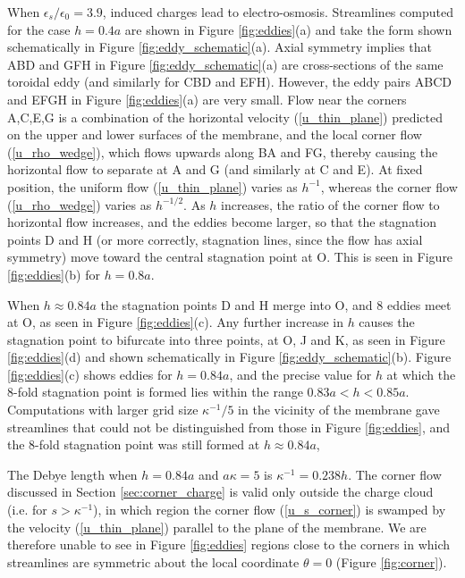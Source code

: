 When $\epsilon_s/\epsilon_0=3.9$, induced charges
lead to electro-osmosis.
Streamlines computed for the case $h=0.4a$ are shown in
Figure \ref{fig:eddies}(a) and take the form shown schematically in
Figure \ref{fig:eddy_schematic}(a).
Axial symmetry implies that ABD and GFH in Figure \ref{fig:eddy_schematic}(a)
are cross-sections of the same
toroidal eddy (and similarly for CBD and EFH).
However, the eddy pairs ABCD and EFGH in Figure \ref{fig:eddies}(a) are
very small. Flow near the corners A,C,E,G is a combination of the horizontal
velocity (\ref{u_thin_plane}) predicted on the upper and
lower surfaces of the membrane,
and the local corner flow (\ref{u_rho_wedge}), which flows upwards
along BA and FG, thereby causing the horizontal flow to separate at A and G
(and similarly at C and E).  At fixed position, the
uniform flow (\ref{u_thin_plane}) varies as $h^{-1}$, whereas the
corner flow (\ref{u_rho_wedge}) varies as 
$h^{-1/2}$. As $h$ increases, the ratio of the corner flow to horizontal flow
increases, and the eddies become larger, so that the stagnation
points D and H 
(or more correctly, stagnation lines, since the flow has axial symmetry)
move toward the central stagnation point at O.
This is seen in 
Figure \ref{fig:eddies}(b) for  $h=0.8a$.

When $h\approx 0.84a$ the stagnation points D and H merge into O, and
8 eddies meet at O, as seen in Figure \ref{fig:eddies}(c).
Any further increase in $h$ causes the
stagnation point to bifurcate into three points, at O, J and K, as
seen in Figure \ref{fig:eddies}(d) and shown schematically in
Figure \ref{fig:eddy_schematic}(b). Figure \ref{fig:eddies}(c)
shows eddies for $h=0.84a$, and the precise
value for $h$ at which the 8-fold stagnation point is formed lies
within the range $0.83a<h<0.85a$.
Computations with 
larger grid size $\kappa^{-1}/5$ in the vicinity of the membrane gave
streamlines that could not be distinguished from those in Figure
\ref{fig:eddies}, and the 8-fold stagnation point was still formed
at $h\approx 0.84a$,

The Debye length when $h=0.84a$ and $a\kappa=5$
is $\kappa^{-1}=0.238h$. The corner flow discussed in
Section \ref{sec:corner_charge} is valid only outside the charge
cloud (i.e. for $s>\kappa^{-1}$),
in which region the corner flow (\ref{u_s_corner})
is swamped by the velocity (\ref{u_thin_plane})
parallel to the plane of the membrane.
We are therefore unable 
to see in Figure \ref{fig:eddies} regions close to the corners
in which streamlines 
are symmetric about the local coordinate $\theta=0$ (Figure \ref{fig:corner}).

